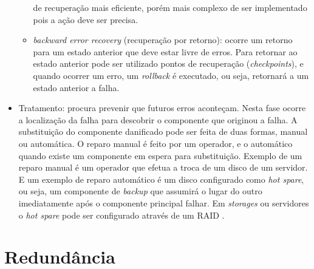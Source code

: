 \begin{itemize}
\begin{itemize}
  de recuperação mais eficiente, porém mais complexo de ser implementado pois a ação deve ser precisa.
  \item \textit{backward error recovery} (recuperação por retorno): ocorre um retorno para um estado anterior que deve estar livre de erros.
  Para retornar ao estado anterior pode ser utilizado pontos de recuperação (\textit{checkpoints}), e quando ocorrer um erro, um \textit{rollback} 
  é executado, ou seja, retornará a um estado anterior a falha.
 \end{itemize}
 \item Tratamento: procura prevenir que futuros erros aconteçam. Nesta fase ocorre a localização da falha para descobrir o 
 componente que originou a falha. A substituição do componente danificado pode ser feita de duas formas, manual ou automática. 
 O reparo manual é feito por um operador, e o automático quando existe um componente em espera para substituição. Exemplo de um reparo 
 manual é um operador que efetua a troca de um disco de um servidor. E um exemplo de reparo automático é um disco configurado como 
 \textit{hot spare}, ou seja, um componente de \textit{backup} que assumirá o lugar do outro imediatamente após o componente principal 
 falhar. Em \textit{storages} ou servidores o \textit{hot spare} pode ser configurado através de um \ac{RAID} \cite{rouse2013}.
\end{itemize}

\section{Redundância}
\label{section:redundancia}


